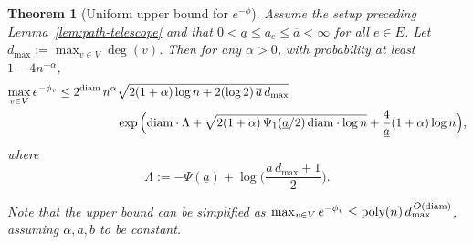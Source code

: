 \documentclass[a4paper, 11pt]{article}
\newcommand{\diam}{\textnormal{diam}}
\newcommand{\poly}{\textnormal{poly}}
\newtheorem{thm}{Theorem}[section]
\begin{document}
\begin{thm}[Uniform upper bound for $e^{-\phi}$]\label{thm:uniform-upper-clean}
Assume the setup preceding Lemma~\ref{lem:path-telescope} and that $0<\underline{a}\le a_e\le \overline{a}<\infty$ for all $e\in E$. Let $d_{\max}:=\max_{v\in V}\deg(v)$. Then for any $\alpha>0$, with probability at least $1-4n^{-\alpha}$,
\begin{equation}
\begin{aligned}
\max_{v\in V} e^{-\phi_v}
\le 
2^{\diam}\,n^{\alpha} & \sqrt{2(1+\alpha)\log n+2(\log 2)\,\overline{a}\,d_{\max}}\, \\
& \exp\Big(
\diam\cdot\Lambda+ \sqrt{2(1+\alpha)\,\Psi_1(\underline{a}/2)\,\diam\cdot\log n}+ \frac{4}{\underline{a}}(1+\alpha)\log n
\Big), \label{eq:uniform-upper-clean}
\end{aligned}
\end{equation}
where
\[
\Lambda:= -\Psi(\underline{a})+\log\Big(\frac{\overline{a}\,d_{\max}+1}{2}\Big).
\]

Note that the upper bound can be simplified as  $\max_{v\in V} e^{-\phi_v} \le \poly(n) \, d_{\max}^{\,O(\diam)}$, assuming $\alpha, a, b$ to be constant.
\end{thm}
\end{document}
